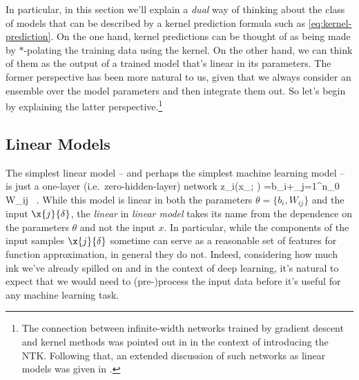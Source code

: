 In particular, in this section we'll explain a \emph{dual} way of thinking about the class of models that can be described by a kernel prediction formula such as \eqref{eq:kernel-prediction}.  On the one hand, kernel predictions can be thought of as being made by $\ast$-polating the training data using the kernel. On the other hand, we can think of them as the output of a trained model that's linear in its parameters. The former perspective has been more natural to us, given that we always consider an ensemble over the model parameters and then integrate them out. So let's begin by explaining the latter  perspective.\footnote{
The connection between infinite-width networks trained by gradient descent and kernel methods was pointed out in \cite{jacot2018neural} in the context of introducing the NTK. Following that, an extended discussion of such networks as linear models was given in  \cite{brainNTK2019}. %
}






\subsection{Linear Models}\label{subsec:linear-models}

The simplest linear model -- and perhaps the simplest machine learning model -- is just a one-layer (i.e.~zero-hidden-layer) network
\be\label{eq:dumb-linear-model-def}
z_i(x_{\delta}; \theta) =b_i+\sum_{j=1}^{n_0} W_{ij}  \, .
\ee
While this model is linear in both the parameters $\theta = \{b_i,  W_{ij}\}$ and the input $\x{j}{\delta}$, the \emph{linear} in \emph{linear model} takes its name from the dependence on the parameters $\theta$ and not the input $x$. In particular, while the components of the input samples $\x{j}{\delta}$ sometime can serve as a reasonable set of features for function approximation, in general they do not.
Indeed, considering how much ink we've already spilled on  and  in the context of deep learning, it's natural to expect that we would need to (pre-)process the input data before it's useful for any machine learning task. 


